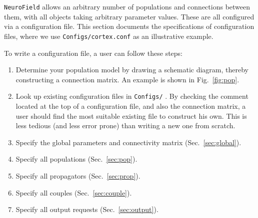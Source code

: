 \documentclass[12pt,a4paper]{article}
\newcommand{\type}[1]{ {\small\small\tt #1} }
\begin{document}
\type{NeuroField} allows an arbitrary number of populations and connections between them, with all objects taking arbitrary parameter values. These are all configured via a configuration file. This section documents the specifications of configuration files, where we use \type{Configs/cortex.conf} as an illustrative example.

To write a configuration file, a user can follow these steps:
\begin{enumerate}
\item Determine your population model by drawing a schematic diagram, thereby constructing a connection matrix. An example is shown in Fig.~\ref{fig:pop}.
\item Look up existing configuration files in \type{Configs/}. By checking the comment located at the top of a configuration file, and also the connection matrix, a user should find the most suitable existing file to construct his own. This is less tedious (and less error prone) than writing a new one from scratch.
\item Specify the global parameters and connectivity matrix (Sec.~\ref{sec:global}).
\item Specify all populations (Sec.~\ref{sec:pop}).
\item Specify all propagators (Sec.~\ref{sec:prop}).
\item Specify all couples (Sec.~\ref{sec:couple}).
\item Specify all output requests (Sec.~\ref{sec:output}).
\end{enumerate}
\end{document}
